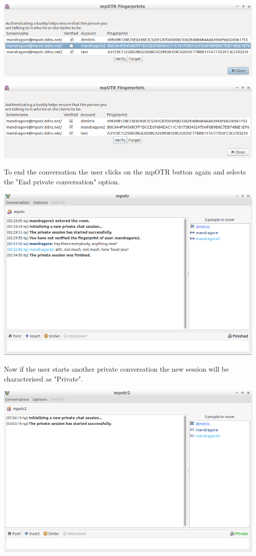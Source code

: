 \documentclass[]{article}
\begin{document}
\includegraphics[scale=0.4]{verification_ui_selected_user_unverified.png}

\includegraphics[scale=0.4]{user_verified_unverified.png}

To end the conversation the user clicks on the mpOTR button again and selects the "End private conversation" option.

\includegraphics[scale=0.4]{finished_unverified.png}

Now if the user starts another private conversation the new session will be characterised as "Private".

\includegraphics[scale=0.4]{started_verified.png}
\end{document}
